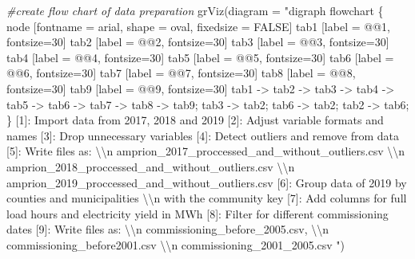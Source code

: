 \documentclass[a4paper,11pt]{article}
\newenvironment{Shaded}{\begin{snugshade}}{\end{snugshade}}
\newcommand{\AttributeTok}[1]{\textcolor[rgb]{0.77,0.63,0.00}{#1}}
\newcommand{\CommentTok}[1]{\textcolor[rgb]{0.56,0.35,0.01}{\textit{#1}}}
\newcommand{\FunctionTok}[1]{\textcolor[rgb]{0.00,0.00,0.00}{#1}}
\newcommand{\NormalTok}[1]{#1}
\newcommand{\SpecialCharTok}[1]{\textcolor[rgb]{0.00,0.00,0.00}{#1}}
\newcommand{\StringTok}[1]{\textcolor[rgb]{0.31,0.60,0.02}{#1}}
\begin{document}
\begin{Shaded}
\begin{Highlighting}[]
\CommentTok{\#create flow chart of data preparation}
\FunctionTok{grViz}\NormalTok{(}\AttributeTok{diagram =} \StringTok{"digraph flowchart \{}
\StringTok{  node [fontname = arial, shape = oval, fixedsize = FALSE]}
\StringTok{  tab1 [label = \textquotesingle{}@@1\textquotesingle{}, fontsize=30]}
\StringTok{  tab2 [label = \textquotesingle{}@@2\textquotesingle{}, fontsize=30]}
\StringTok{  tab3 [label = \textquotesingle{}@@3\textquotesingle{}, fontsize=30]}
\StringTok{  tab4 [label = \textquotesingle{}@@4\textquotesingle{}, fontsize=30]}
\StringTok{  tab5 [label = \textquotesingle{}@@5\textquotesingle{}, fontsize=30]}
\StringTok{  tab6 [label = \textquotesingle{}@@6\textquotesingle{}, fontsize=30]}
\StringTok{  tab7 [label = \textquotesingle{}@@7\textquotesingle{}, fontsize=30]}
\StringTok{  tab8 [label = \textquotesingle{}@@8\textquotesingle{}, fontsize=30]}
\StringTok{  tab9 [label = \textquotesingle{}@@9\textquotesingle{}, fontsize=30]}
\StringTok{  }
\StringTok{  }
\StringTok{  tab1 {-}\textgreater{} tab2 {-}\textgreater{} tab3 {-}\textgreater{} tab4 {-}\textgreater{} tab5 {-}\textgreater{} tab6 {-}\textgreater{} tab7 {-}\textgreater{} tab8 {-}\textgreater{} tab9;}
\StringTok{  tab3 {-}\textgreater{} tab2;}
\StringTok{  tab6 {-}\textgreater{} tab2;}
\StringTok{  tab2 {-}\textgreater{} tab6;}
\StringTok{\}}
\StringTok{  }
\StringTok{  [1]: \textquotesingle{}Import data from 2017, 2018 and 2019\textquotesingle{}}
\StringTok{  [2]: \textquotesingle{}Adjust variable formats and names\textquotesingle{}}
\StringTok{  [3]: \textquotesingle{}Drop unnecessary variables\textquotesingle{} }
\StringTok{  [4]: \textquotesingle{}Detect outliers and remove from data\textquotesingle{}}
\StringTok{  [5]: \textquotesingle{}Write files as: }\SpecialCharTok{\textbackslash{}\textbackslash{}}\StringTok{n amprion\_2017\_proccessed\_and\_without\_outliers.csv }
\StringTok{  }\SpecialCharTok{\textbackslash{}\textbackslash{}}\StringTok{n amprion\_2018\_proccessed\_and\_without\_outliers.csv }\SpecialCharTok{\textbackslash{}\textbackslash{}}\StringTok{n }
\StringTok{  amprion\_2019\_proccessed\_and\_without\_outliers.csv\textquotesingle{}}
\StringTok{  [6]: \textquotesingle{}Group data of 2019 by counties and municipalities }\SpecialCharTok{\textbackslash{}\textbackslash{}}\StringTok{n }
\StringTok{  with the community key\textquotesingle{}}
\StringTok{  [7]: \textquotesingle{}Add columns for full load hours and electricity yield in MWh\textquotesingle{}}
\StringTok{  [8]: \textquotesingle{}Filter for different commissioning dates\textquotesingle{}}
\StringTok{  [9]: \textquotesingle{}Write files as: }\SpecialCharTok{\textbackslash{}\textbackslash{}}\StringTok{n commissioning\_before\_2005.csv, }\SpecialCharTok{\textbackslash{}\textbackslash{}}\StringTok{n }
\StringTok{  commissioning\_before2001.csv }\SpecialCharTok{\textbackslash{}\textbackslash{}}\StringTok{n commissioning\_2001\_2005.csv\textquotesingle{}}
\StringTok{  }
\StringTok{  "}\NormalTok{)}




\end{Highlighting}
\end{Shaded}
\end{document}
